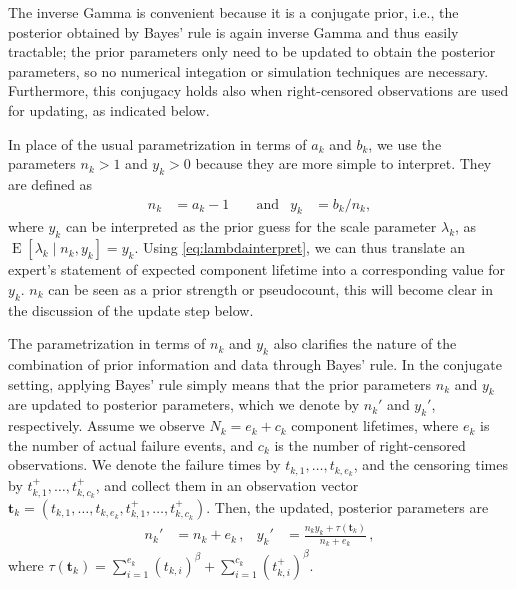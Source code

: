 \documentclass[authoryear]{elsarticle}
\renewcommand{\vec}[1]{{\bm#1}}
\newcommand{\uz}{^{(0)}} %
\newcommand{\un}{^{(n)}} %
\newcommand{\E}{\operatorname{E}}
\newcommand{\nk}{n_k}
\newcommand{\nkp}{n_k'}
\newcommand{\yk}{y_k}
\newcommand{\ykp}{y_k'}
\def\tautk{\tau(\vec{t}_k)}
\begin{document}
The inverse Gamma is convenient because it is a conjugate prior,
i.e., the posterior obtained by Bayes' rule is again inverse Gamma and thus easily tractable;
the prior parameters only need to be updated to obtain the posterior parameters,
so no numerical integation or simulation techniques are necessary.
Furthermore, this conjugacy holds also when right-censored observations are used for updating,
as indicated below.

In place of the usual parametrization in terms of $a_k$ and $b_k$,
we use the parameters $\nk > 1$ and $\yk > 0$
because they are more simple to interpret.
They are defined as
\begin{align}
\nk &= a_k - 1 & &\text{ and}
&
\yk &= b_k / \nk,
\label{eq:abtony}
\end{align}
where $\yk$ can be interpreted as the prior guess for the scale parameter $\lambda_k$,
as $\E[\lambda_k\mid\nk,\yk] = \yk$.
Using \eqref{eq:lambdainterpret},
we can thus translate an expert's statement of expected component lifetime into a corresponding value for $\yk$.
$\nk$ can be seen as a prior strength or pseudocount,
this will become clear in the discussion of the update step below.

The parametrization in terms of $\nk$ and $\yk$ also clarifies the nature of the combination
of prior information and data through Bayes' rule.
In the conjugate setting,
applying Bayes' rule simply means that the prior parameters $\nk$ and $\yk$
are updated to posterior parameters, which we denote by $\nkp$ and $\ykp$, respectively.
Assume we observe $N_k = e_k + c_k$ component lifetimes,
where $e_k$ is the number of actual failure events,
and $c_k$ is the number of right-censored observations.
We denote the failure times by $t_{k,1}, \ldots, t_{k,e_k}$,
and the censoring times by $t^+_{k,1}, \ldots, t^+_{k,c_k}$,
and collect them in an observation vector $\vec{t}_k = (t_{k,1}, \ldots, t_{k,e_k}, t^+_{k,1}, \ldots, t^+_{k,c_k})$.
Then, the updated, posterior parameters are
\begin{align}
\nkp &= \nk + e_k\,, 
&
\ykp &=  \frac{\nk \yk + \tautk}{\nk + e_k}\,,
\label{eq:ig-update}
\end{align}
where $\tautk = \sum_{i=1}^{e_k} (t_{k,i})^\beta + \sum_{i=1}^{c_k} (t^+_{k,i})^\beta$.
\end{document}
